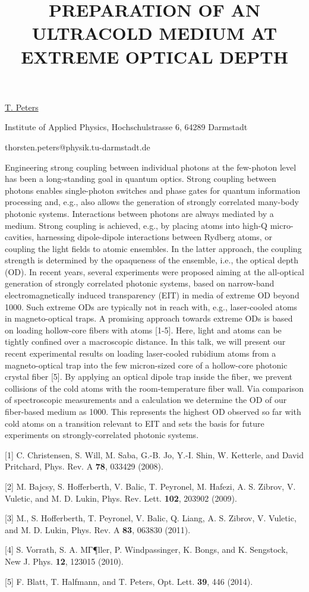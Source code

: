 \title{PREPARATION OF AN ULTRACOLD MEDIUM AT EXTREME OPTICAL DEPTH}

\underline{T. Peters} 

{\normalsize{\vspace{-4mm}
Institute of Applied Physics,
Hochschulstrasse 6,
64289 Darmstadt

\email thorsten.peters@physik.tu-darmstadt.de}}

Engineering strong coupling between individual photons at the few-photon level has been a long-standing goal in quantum optics. Strong coupling between photons enables single-photon switches and phase gates for quantum information processing and, e.g., also allows the generation of strongly correlated many-body photonic systems.
Interactions between photons are always mediated by a medium. Strong coupling is achieved, e.g., by placing atoms into high-Q micro-cavities, harnessing dipole-dipole interactions between Rydberg atoms, or coupling the light fields to atomic ensembles. In the latter approach, the coupling strength is determined by the opaqueness of the ensemble, i.e., the optical depth (OD).
In recent years, several experiments were proposed aiming at the all-optical generation of strongly correlated photonic systems, based on narrow-band electromagnetically induced transparency (EIT) in media of extreme OD beyond 1000. Such extreme ODs are typically not in reach with, e.g., laser-cooled atoms in magneto-optical traps. A promising approach towards extreme ODs is based on loading hollow-core fibers with atoms [1-5]. Here, light and atoms can be tightly confined over a macroscopic distance.
In this talk, we will present our recent experimental results on loading laser-cooled rubidium atoms from a magneto-optical trap into the few micron-sized core of a hollow-core photonic crystal fiber [5]. By applying an optical dipole trap inside the fiber, we prevent collisions of the cold atoms with the room-temperature fiber wall. Via comparison of spectroscopic measurements and a calculation we determine the OD of our fiber-based medium as 1000. This represents the highest OD observed so far with cold atoms on a transition relevant to EIT and sets the basis for future experiments on strongly-correlated photonic systems.

{\normalsize
[1] C. Christensen, S. Will, M. Saba, G.-B. Jo, Y.-I. Shin, W. Ketterle, and David Pritchard, Phys. Rev. A \textbf{78}, 033429 (2008).
\vsp

[2] M. Bajcsy, S. Hofferberth, V. Balic, T. Peyronel, M. Hafezi, A. S. Zibrov, V. Vuletic, and M. D. Lukin, Phys. Rev. Lett. \textbf{102}, 203902 (2009).
\vsp

[3] M., S. Hofferberth, T. Peyronel, V. Balic, Q. Liang, A. S. Zibrov, V. Vuletic, and M. D. Lukin, Phys. Rev. A \textbf{83}, 063830 (2011).
\vsp

[4] S. Vorrath, S. A. MГ¶ller, P. Windpassinger, K. Bongs, and K. Sengstock, New J. Phys. \textbf{12}, 123015 (2010).
\vsp

[5] F. Blatt, T. Halfmann, and T. Peters, Opt. Lett. \textbf{39}, 446 (2014).
}

\vspace{\baselineskip}
